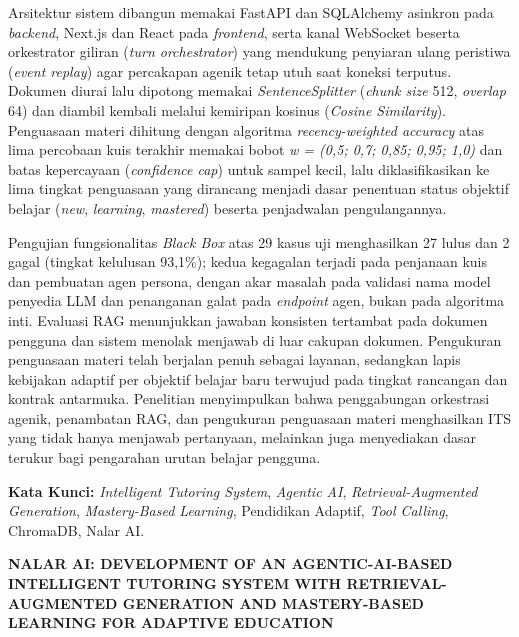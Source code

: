 \documentclass[12pt,a4paper]{article}
\begin{document}
Arsitektur sistem dibangun memakai FastAPI dan SQLAlchemy asinkron pada \textit{backend}, Next.js dan React pada \textit{frontend}, serta kanal WebSocket beserta orkestrator giliran (\textit{turn orchestrator}) yang mendukung penyiaran ulang peristiwa (\textit{event replay}) agar percakapan agenik tetap utuh saat koneksi terputus. Dokumen diurai lalu dipotong memakai \textit{SentenceSplitter} (\textit{chunk size} 512, \textit{overlap} 64) dan diambil kembali melalui kemiripan kosinus (\textit{Cosine Similarity}). Penguasaan materi dihitung dengan algoritma \textit{recency-weighted accuracy} atas lima percobaan kuis terakhir memakai bobot \textit{w = (0,5; 0,7; 0,85; 0,95; 1,0)} dan batas kepercayaan (\textit{confidence cap}) untuk sampel kecil, lalu diklasifikasikan ke lima tingkat penguasaan yang dirancang menjadi dasar penentuan status objektif belajar (\textit{new}, \textit{learning}, \textit{mastered}) beserta penjadwalan pengulangannya.



Pengujian fungsionalitas \textit{Black Box} atas 29 kasus uji menghasilkan 27 lulus dan 2 gagal (tingkat kelulusan 93,1\%); kedua kegagalan terjadi pada penjanaan kuis dan pembuatan agen persona, dengan akar masalah pada validasi nama model penyedia LLM dan penanganan galat pada \textit{endpoint} agen, bukan pada algoritma inti. Evaluasi RAG menunjukkan jawaban konsisten tertambat pada dokumen pengguna dan sistem menolak menjawab di luar cakupan dokumen. Pengukuran penguasaan materi telah berjalan penuh sebagai layanan, sedangkan lapis kebijakan adaptif per objektif belajar baru terwujud pada tingkat rancangan dan kontrak antarmuka. Penelitian menyimpulkan bahwa penggabungan orkestrasi agenik, penambatan RAG, dan pengukuran penguasaan materi menghasilkan ITS yang tidak hanya menjawab pertanyaan, melainkan juga menyediakan dasar terukur bagi pengarahan urutan belajar pengguna.



\textbf{Kata Kunci:} \textit{Intelligent Tutoring System}, \textit{Agentic AI}, \textit{Retrieval-Augmented Generation}, \textit{Mastery-Based Learning}, Pendidikan Adaptif, \textit{Tool Calling}, ChromaDB, Nalar AI.



\newpage

\textbf{NALAR AI: DEVELOPMENT OF AN AGENTIC-AI-BASED INTELLIGENT TUTORING SYSTEM WITH RETRIEVAL-AUGMENTED GENERATION AND MASTERY-BASED LEARNING FOR ADAPTIVE EDUCATION}
\end{document}
